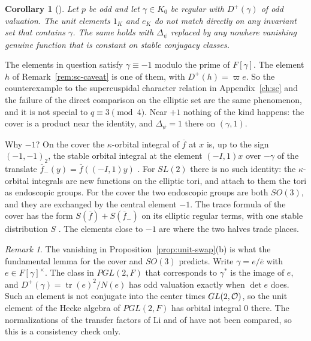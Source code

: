 \documentclass[12pt,letterpaper,openany]{book}
\theoremstyle{plain}
\newtheorem{corollary}[theorem]{Corollary}
\theoremstyle{definition}
\theoremstyle{remark}
\theoremstyle{remark}
\newtheorem{remyy}{Remark}
\newcommand{\tr}{\operatorname{tr}}
\begin{document}
\begin{corollary}[{\cite[Corollary~8.7]{JC}}]\label{cor:no-fl}
Let $p$ be odd and let $\gamma\in K_0$ be regular with $D^+(\gamma)$ of
odd valuation. The unit elements $1_K$ and $e_K$ do not match directly
on any invariant set that contains $\gamma$. The same holds with
$\Delta_\psi$ replaced by any nowhere vanishing genuine function that is
constant on stable conjugacy classes.
\end{corollary}

The elements in question satisfy $\gamma\equiv-1$ modulo the prime of
$F[\gamma]$. The element $h$ of Remark~\ref{rem:sc-caveat} is
one of them, with $D^+(h)=\varpi e$. So the counterexample to the
supercuspidal character relation in Appendix~\ref{ch:sc} and the failure
of the direct comparison on the elliptic set are the same phenomenon,
and it is not special to $q\equiv3\pmod4$. Near $+1$ nothing of the
kind happens: the cover is a product near the identity, and
$\Delta_\psi=1$ there on $(\gamma,1)$.

Why $-1$? On the cover the $\kappa$-orbital integral of
$\overline f$ at $x$ is, up to the sign $(-1,-1)_2$, the stable orbital
integral at the element $(-I,1)x$ over $-\gamma$ of the translate
$\overline f_-(y)=\overline f((-I,1)y)$ \cite[Lemma~7.6(c)]{JC}. For
$SL(2)$ there is no such identity: the $\kappa$-orbital integrals are new
functions on the elliptic tori, and \cite{LL} attach to them the tori as
endoscopic groups. For the cover the two endoscopic groups are both
$SO(3)$, and they are exchanged by the central element $-1$. The trace
formula of the cover has the form $S(\overline f)+S(\overline f_-)$ on
its elliptic regular terms, with one stable distribution $S$
\cite[Theorem~7.7]{JC}. The elements close to $-1$ are where the two
halves trade places.

\begin{remyy}\label{rem26:li-fl}
The vanishing in Proposition~\ref{prop:unit-swap}(b) is what the
fundamental lemma for the cover and $SO(3)$ predicts. Write
$\gamma=e/\overline e$ with $e\in F[\gamma]^\times$. The class in
$PGL(2,F)$ that corresponds to $\gamma^*$ is the image of $e$, and
$D^+(\gamma)=\tr(e)^2/N(e)$ has odd valuation exactly when $\det e$ does.
Such an element is not conjugate into the center times
$GL(2,{\cal O})$, so the unit element of the Hecke algebra of
$PGL(2,F)$ has orbital integral $0$ there. The normalizations of the
transfer factors of Li and of \cite{JC} have not been compared, so this
is a consistency check only.
\end{remyy}
\end{document}
